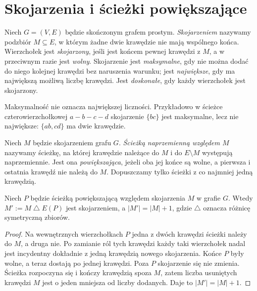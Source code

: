 \section{Skojarzenia i ścieżki powiększające}
\label{sec:tg-matchings}

\begin{definicja}[Skojarzenie]
Niech $G=(V,E)$ będzie skończonym grafem prostym.
\emph{Skojarzeniem} nazywamy podzbiór $M\subseteq E$,
w którym żadne dwie krawędzie nie mają wspólnego końca.
Wierzchołek jest \emph{skojarzony}, jeśli jest końcem
pewnej krawędzi z $M$, a w przeciwnym razie jest
\emph{wolny}. Skojarzenie jest \emph{maksymalne}, gdy
nie można dodać do niego kolejnej krawędzi bez
naruszenia warunku; jest \emph{największe}, gdy ma
największą możliwą liczbę krawędzi. Jest \emph{doskonałe},
gdy każdy wierzchołek jest skojarzony.
\end{definicja}

Maksymalność nie oznacza największej liczności.
Przykładowo w ścieżce czterowierzchołkowej $a-b-c-d$
skojarzenie $\{bc\}$ jest maksymalne, lecz nie największe:
$\{ab,cd\}$ ma dwie krawędzie.

\begin{definicja}
Niech $M$ będzie skojarzeniem grafu $G$. \emph{Ścieżką
naprzemienną względem $M$} nazywamy ścieżkę, na której
krawędzie należące do $M$ i do $E\setminus M$
występują naprzemiennie. Jest ona \emph{powiększająca},
jeżeli oba jej końce są wolne, a pierwsza i ostatnia
krawędź nie należą do $M$. Dopuszczamy tylko ścieżki
z co najmniej jedną krawędzią.
\end{definicja}

\begin{lemat}
Niech $P$ będzie ścieżką powiększającą względem
skojarzenia $M$ w grafie $G$. Wtedy
$M':=M\mathbin{\triangle}E(P)$ jest skojarzeniem,
a $|M'|=|M|+1$, gdzie $\triangle$ oznacza różnicę
symetryczną zbiorów.
\end{lemat}

\begin{proof}
Na wewnętrznych wierzchołkach $P$ jedna z dwóch
krawędzi ścieżki należy do $M$, a druga nie.
Po zamianie ról tych krawędzi każdy taki wierzchołek
nadal jest incydentny dokładnie z jedną krawędzią
nowego skojarzenia. Końce $P$ były wolne,
a teraz dostają po jednej krawędzi. Poza $P$
skojarzenie się nie zmienia. Ścieżka rozpoczyna się
i kończy krawędzią spoza $M$, zatem liczba usuniętych
krawędzi $M$ jest o jeden mniejsza od liczby dodanych.
Daje to $|M'|=|M|+1$.
\end{proof}

